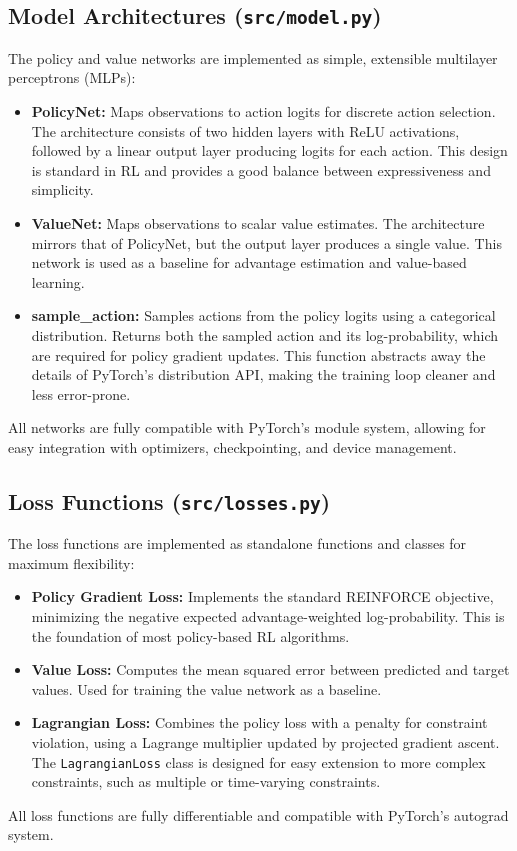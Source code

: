 \documentclass[11pt]{article}
\begin{document}
\subsection{Model Architectures (\texttt{src/model.py})}
The policy and value networks are implemented as simple, extensible multilayer perceptrons (MLPs):
\begin{itemize}
  \item \textbf{PolicyNet:} Maps observations to action logits for discrete action selection. The architecture consists of two hidden layers with ReLU activations, followed by a linear output layer producing logits for each action. This design is standard in RL and provides a good balance between expressiveness and simplicity.
  \item \textbf{ValueNet:} Maps observations to scalar value estimates. The architecture mirrors that of PolicyNet, but the output layer produces a single value. This network is used as a baseline for advantage estimation and value-based learning.
  \item \textbf{sample\_action:} Samples actions from the policy logits using a categorical distribution. Returns both the sampled action and its log-probability, which are required for policy gradient updates. This function abstracts away the details of PyTorch's distribution API, making the training loop cleaner and less error-prone.
\end{itemize}
All networks are fully compatible with PyTorch's module system, allowing for easy integration with optimizers, checkpointing, and device management.

\subsection{Loss Functions (\texttt{src/losses.py})}
The loss functions are implemented as standalone functions and classes for maximum flexibility:
\begin{itemize}
  \item \textbf{Policy Gradient Loss:} Implements the standard REINFORCE objective, minimizing the negative expected advantage-weighted log-probability. This is the foundation of most policy-based RL algorithms.
  \item \textbf{Value Loss:} Computes the mean squared error between predicted and target values. Used for training the value network as a baseline.
  \item \textbf{Lagrangian Loss:} Combines the policy loss with a penalty for constraint violation, using a Lagrange multiplier updated by projected gradient ascent. The \texttt{LagrangianLoss} class is designed for easy extension to more complex constraints, such as multiple or time-varying constraints.
\end{itemize}
All loss functions are fully differentiable and compatible with PyTorch's autograd system.
\end{document}
